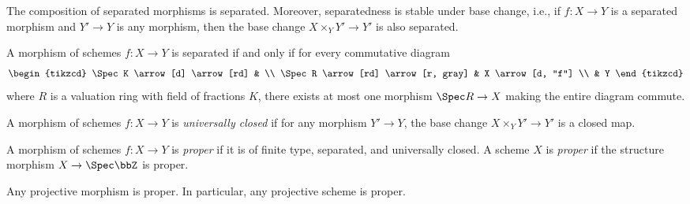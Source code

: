     \begin{proposition}\label{prop:composition_and_base_change_of_separated_morphisms}
        The composition of separated morphisms is separated.
        Moreover, separatedness is stable under base change, i.e., if \(f : X \to Y\) is a separated morphism and \(Y' \to Y\) is any morphism, then the base change \(X \times_Y Y' \to Y'\) is also separated.
        
    \end{proposition}

    \begin{proposition}\label{prop:valuative_criterion_of_separatedness}
        A morphism of schemes \(f : X \to Y\) is separated if and only if for every commutative diagram
        \[
            \begin{tikzcd}
                \Spec K \arrow[d] \arrow[rd]        & \\
                \Spec R \arrow[rd] \arrow[r, gray]  & X \arrow[d, "f"] \\
                                                    & Y
            \end{tikzcd}
        \]
        where \(R\) is a valuation ring with field of fractions \(K\), there exists at most one morphism \(\Spec R \to X\) making the entire diagram commute.
    \end{proposition}

    \begin{definition}\label{def:universally_closed_morphism}
        A morphism of schemes \(f : X \to Y\) is \emph{universally closed} if for any morphism \(Y' \to Y\), the base change \(X \times_Y Y' \to Y'\) is a closed map.
    \end{definition}

    \begin{definition}\label{def:proper_morphism_and_proper_scheme}
        A morphism of schemes \(f : X \to Y\) is \emph{proper} if it is of finite type, separated, and universally closed.
        A scheme \(X\) is \emph{proper} if the structure morphism \(X \to \Spec \bbZ\) is proper.
    \end{definition}

    \begin{theorem}\label{prop:projective_morphism_is_proper}
        Any projective morphism is proper.
        In particular, any projective scheme is proper.
    \end{theorem}

